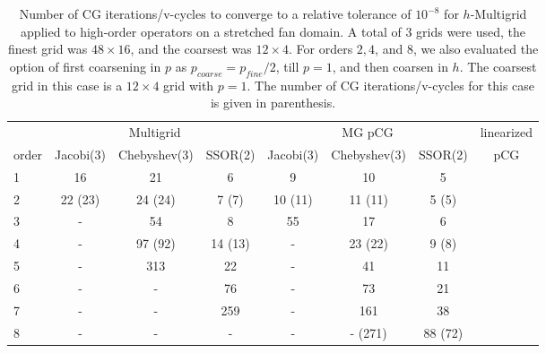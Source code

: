 \begin{table}
  \caption{\label{tab:fan-aniso} Number of CG iterations/v-cycles to converge to a relative tolerance of $10^{-8}$ for $h$-Multigrid applied to high-order operators on a stretched fan domain. A total of 3 grids were used, the finest grid was $48\times 16$, and the coarsest was $12\times 4$. For orders $2,4$, and $8$, we also evaluated the option of first coarsening in $p$ as $p_{coarse} = p_{fine}/2$, till $p=1$, and then coarsen in $h$. The coarsest grid in this case is a $12\times 4$ grid with $p=1$. The number of CG iterations/v-cycles for this case is given in parenthesis.}
		\centering
    \begin{tabular}{|l|c|c|c|c|c|c|c|} 
\hline
                     & \multicolumn{3}{c|}{Multigrid} & \multicolumn{3}{c|}{MG pCG} &          linearized  \\
\cline{2-7}
			order &          \scriptsize Jacobi(3) &   \scriptsize  Chebyshev(3) & \scriptsize SSOR(2) & \scriptsize Jacobi(3) & \scriptsize  Chebyshev(3) & \scriptsize SSOR(2) & pCG\\
\hline
                   1 &                             16 &                          21 &                   6 &                     9 &                        10 &                   5 &    \\
                   2 &                        22 (23) &                     24 (24) &               7 (7) &               10 (11) &                   11 (11) &               5 (5) &    \\
                   3 &                              - &                          54 &                   8 &                    55 &                        17 &                   6 &    \\
                   4 &                              - &                     97 (92) &             14 (13) &                     - &                   23 (22) &               9 (8) &    \\
                   5 &                              - &                         313 &                  22 &                     - &                        41 &                  11 &    \\
                   6 &                              - &                           - &                  76 &                     - &                        73 &                  21 &    \\
                   7 &                              - &                           - &                 259 &                     - &                       161 &                  38 &    \\
                   8 &                              - &                           - &                   - &                     - &                   - (271) &             88 (72) &    \\
\hline
	  \end{tabular}
\end{table}


